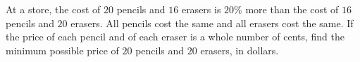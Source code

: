 At a store, the cost of $20$ pencils and $16$ erasers is $20\%$ more than the cost of $16$ pencils and $20$ erasers. All pencils cost the same and all erasers cost the same. If the price of each pencil and of each eraser is a whole number of cents, find the minimum possible price of $20$ pencils and $20$ erasers, in dollars.
